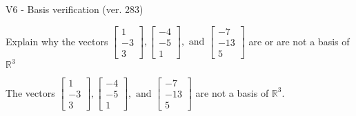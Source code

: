 \begin{exercise}
  \begin{exerciseTitle}V6 - Basis verification (ver. 283)\end{exerciseTitle}
  \begin{exerciseStatement}
    Explain why the vectors \(\left[\begin{array}{r}
1 \\
-3 \\
3
\end{array}\right] , \left[\begin{array}{r}
-4 \\
-5 \\
1
\end{array}\right] , \text{ and } \left[\begin{array}{r}
-7 \\
-13 \\
5
\end{array}\right]\) are or are not a basis of \(\mathbb{R}^3\)	


  \end{exerciseStatement}
  \begin{exerciseAnswer}
   The vectors \(\left[\begin{array}{r}
1 \\
-3 \\
3
\end{array}\right] , \left[\begin{array}{r}
-4 \\
-5 \\
1
\end{array}\right] , \text{ and } \left[\begin{array}{r}
-7 \\
-13 \\
5
\end{array}\right]\) 
  	 are not  a basis of \(\mathbb{R}^3\).
  


  \end{exerciseAnswer}
\end{exercise}